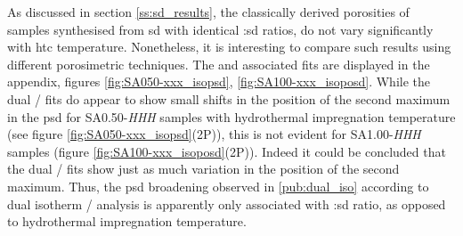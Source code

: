 As discussed in section \ref{ss:sd_results}, the classically derived porosities of samples synthesised from \acrfull{sd} with identical :\acrshort{sd} ratios, do not vary significantly with \acrshort{htc} temperature. Nonetheless, it is interesting to compare such results using different porosimetric techniques. The  and associated fits are displayed in the appendix, figures \ref{fig:SA050-xxx_isopsd}, \ref{fig:SA100-xxx_isoposd}. While the dual / fits do appear to show small shifts in the position of the second maximum in the \acrshort{psd} for SA0.50-\textit{HHH} samples with hydrothermal impregnation temperature (see figure \ref{fig:SA050-xxx_isopsd}(2P)), this is not evident for SA1.00-\textit{HHH} samples (figure \ref{fig:SA100-xxx_isoposd}(2P)). Indeed it could be concluded that the dual / fits show just as much variation in the position of the second maximum. Thus, the \acrshort{psd} broadening observed in \ref{pub:dual_iso} according to dual isotherm / analysis is apparently only associated with :\acrshort{sd} ratio, as opposed to hydrothermal impregnation temperature.

